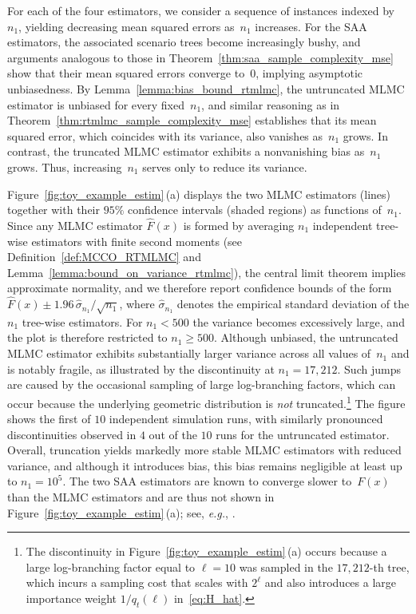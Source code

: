 \documentclass[11pt]{article}
\let\hat\widehat
\begin{document}
For each of the four estimators, we consider a sequence of instances indexed by~$n_1$, yielding decreasing mean squared errors as~$n_1$ increases. For the SAA estimators, the associated scenario trees become increasingly bushy, and arguments analogous to those in Theorem~\ref{thm:saa_sample_complexity_mse} show that their mean squared errors converge to~$0$, implying asymptotic unbiasedness. By Lemma~\ref{lemma:bias_bound_rtmlmc}, the untruncated MLMC estimator is unbiased for every fixed~$n_1$, and similar reasoning as in Theorem~\ref{thm:rtmlmc_sample_complexity_mse} establishes that its mean squared error, which coincides with its variance, also vanishes as~$n_1$ grows. In contrast, the truncated MLMC estimator exhibits a nonvanishing bias as~$n_1$ grows. Thus, increasing~$n_1$ serves only to reduce its variance. 

Figure~\ref{fig:toy_example_estim}\,(a) displays the two MLMC estimators (lines) together with their $95\%$ confidence intervals (shaded regions) as functions of~$n_1$. Since any MLMC estimator $\hat F(x)$ is formed by averaging $n_1$ independent tree-wise estimators with finite second moments (see Definition~\ref{def:MCCO_RTMLMC} and Lemma~\ref{lemma:bound_on_variance_rtmlmc}), the central limit theorem implies approximate normality, and we therefore report confidence bounds of the form $\hat F(x)\pm 1.96\,\hat\sigma_{n_1}/\sqrt{n_1}$, where $\hat\sigma_{n_1}$ denotes the empirical standard deviation of the $n_1$ tree-wise estimators. For $n_1<500$ the variance becomes excessively large, and the plot is therefore restricted to $n_1\ge 500$. Although unbiased, the untruncated MLMC estimator exhibits substantially larger variance across all values of~$n_1$ and is notably fragile, as illustrated by the discontinuity at $n_1=17{,}212$. Such jumps are caused by the occasional sampling of large log-branching factors, which can occur because the underlying geometric distribution is {\em not} truncated.\footnote{The discontinuity in Figure~\ref{fig:toy_example_estim}\,(a) occurs because a large log-branching factor equal to $\ell=10$ was sampled in the $17{,}212$-th tree, which incurs a sampling cost that scales with $2^{\ell}$ and also introduces a large importance weight $1/q_t(\ell)$ in~\eqref{eq:H_hat}.} The figure shows the first of $10$ independent simulation runs, with similarly pronounced discontinuities observed in $4$ out of the $10$ runs for the untruncated estimator. Overall, truncation yields markedly more stable MLMC estimators with reduced variance, and although it introduces bias, this bias remains negligible at least up to $n_1=10^5$. The two SAA estimators are known to converge slower to~$F(x)$ than the MLMC estimators and are thus not shown in Figure~\ref{fig:toy_example_estim}\,(a); see, {\em e.g.}, \cite[\S~3]{syed2023optimal}. 
\end{document}
